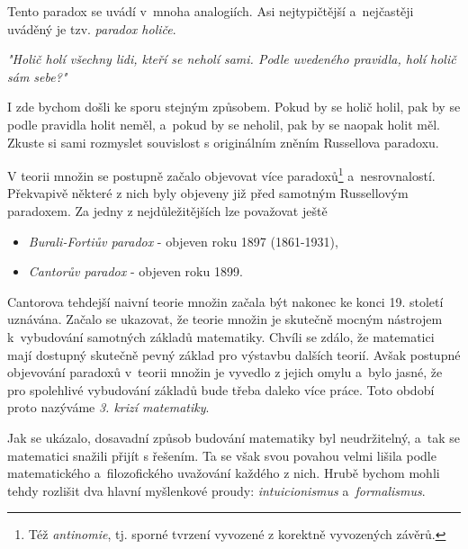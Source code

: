Tento paradox se uvádí v~mnoha analogiích. Asi nejtypičtější a~nejčastěji uváděný je tzv. \emph{paradox holiče}.

\textit{"Holič holí všechny lidi, kteří se neholí sami. Podle uvedeného pravidla, holí holič sám sebe?"}

I zde bychom došli ke sporu stejným způsobem. Pokud by se holič holil, pak by se podle pravidla holit neměl, a~pokud by se neholil, pak by se naopak holit měl. Zkuste si sami rozmyslet souvislost s originálním zněním Russellova paradoxu.\par
V teorii množin se postupně začalo objevovat více paradoxů\footnote{Též \emph{antinomie}, tj. sporné tvrzení vyvozené z korektně vyvozených závěrů.} a~nesrovnalostí. Překvapivě některé z nich byly objeveny již před samotným Russellovým paradoxem. Za jedny z nejdůležitějších lze považovat ještě
\begin{itemize}
\item \emph{Burali-Fortiův paradox} - objeven roku 1897  \mbox{(1861-1931)},
\item \emph{Cantorův paradox} - objeven roku 1899.
\end{itemize}
\medskip

Cantorova tehdejší naivní teorie množin začala být nakonec ke konci 19. století uznávána. Začalo se ukazovat, že teorie množin je skutečně mocným nástrojem k~vybudování samotných základů matematiky. Chvíli se zdálo, že matematici mají dostupný skutečně pevný základ pro výstavbu dalších teorií. Avšak postupné objevování paradoxů v~teorii množin je vyvedlo z jejich omylu a~bylo jasné, že pro spolehlivé vybudování základů bude třeba daleko více práce. Toto období proto nazýváme \emph{3. krizí matematiky}.\par
Jak se ukázalo, dosavadní způsob budování matematiky byl neudržitelný, a~tak se matematici snažili přijít s řešením. Ta se však svou povahou velmi lišila podle matematického a~filozofického uvažování každého z nich. Hrubě bychom mohli tehdy rozlišit dva hlavní myšlenkové proudy: \emph{intuicionismus} a~\emph{formalismus}.
\medskip

